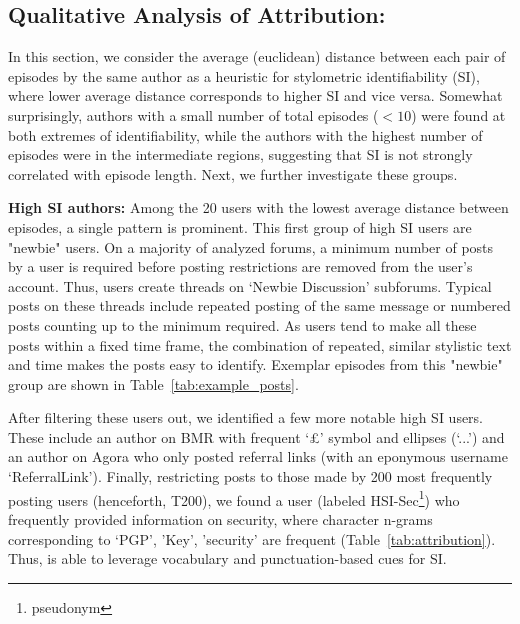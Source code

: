 \subsection{Qualitative Analysis of Attribution:}
\label{sec:sysml:casestudy:qualitative}
In this section, we consider the average (euclidean) distance between each pair of episodes by the same author as a heuristic for stylometric identifiability (SI), where lower average distance corresponds to higher SI and vice versa. 
Somewhat surprisingly, 
authors with a small number of total episodes ($<10$) were found at both extremes of identifiability, while the authors with the highest number of episodes were in the intermediate regions, suggesting that SI is not strongly correlated with episode length.  Next, we further investigate these groups.

\noindent \textbf{High SI authors:} 
Among the 20 users with the lowest average distance between episodes, a single pattern is prominent. 
This first group of high SI users are "newbie" users.  On a majority of analyzed forums, a minimum number of posts by a user is required before posting restrictions are removed from the user's account.
Thus, users create threads on `Newbie Discussion' subforums.
Typical posts on these threads include repeated posting of the same message or numbered posts counting up to the minimum required. 
As users tend to make all these posts within a fixed time frame, the combination of repeated, similar stylistic text and time makes the posts easy to identify. 
Exemplar episodes from this "newbie" group are shown in Table~\ref{tab:example_posts}. 

After filtering these users out, we identified a few more notable high SI users.
These include an author on BMR with frequent `\pounds' symbol and ellipses (`...') and an author on Agora who only posted referral links (with an eponymous username `ReferralLink'). 
Finally, restricting posts to those made by 200 most frequently posting users (henceforth, T200), we found a user (labeled HSI-Sec\footnote{pseudonym}) who frequently provided information on security, where character n-grams corresponding to `PGP', 'Key', 'security' are frequent (Table~\ref{tab:attribution}). 
Thus, \SYSMLmethodname{} is able to leverage vocabulary and punctuation-based cues for SI.


